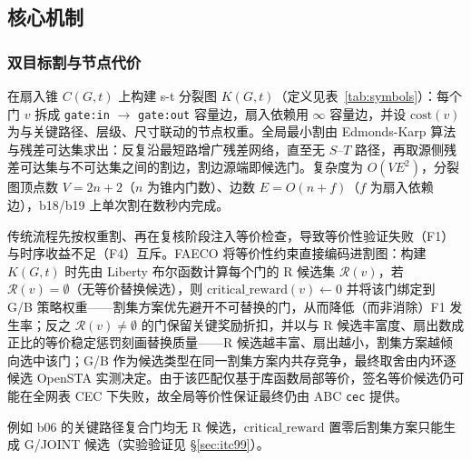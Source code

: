 \documentclass[journal]{IEEEtran}
\begin{document}
\subsection{核心机制}\label{sec:mechanism}

\subsubsection{双目标割与节点代价}
在扇入锥 $C(G, t)$ 上构建 s-t 分裂图 $K(G, t)$（定义见表~\ref{tab:symbols}）：每个门 $v$ 拆成 \texttt{gate:in} $\rightarrow$ \texttt{gate:out} 容量边，扇入依赖用 $\infty$ 容量边，并设 $\mathrm{cost}(v)$ 为与关键路径、层级、尺寸联动的节点权重。全局最小割由 Edmonds-Karp 算法与残差可达集求出：反复沿最短路增广残差网络，直至无 $S$--$T$ 路径，再取源侧残差可达集与不可达集之间的割边，割边源端即候选门。复杂度为 $O(VE^2)$，分裂图顶点数 $V=2n+2$（$n$ 为锥内门数）、边数 $E=O(n+f)$（$f$ 为扇入依赖边），b18/b19 上单次割在数秒内完成。

传统流程先按权重割、再在复核阶段注入等价检查，导致等价性验证失败（F1）与时序收益不足（F4）互斥。FAECO 将等价性约束直接编码进割图：构建 $K(G, t)$ 时先由 Liberty 布尔函数计算每个门的 R 候选集 $\mathcal{R}(v)$，若 $\mathcal{R}(v)=\emptyset$（无等价替换候选），则 $\mathrm{critical\_reward}(v) \leftarrow 0$ 并将该门绑定到 G/B 策略权重——割集方案优先避开不可替换的门，从而降低（而非消除）F1 发生率；反之 $\mathcal{R}(v)\neq\emptyset$ 的门保留关键奖励折扣，并以与 R 候选丰富度、扇出数成正比的等价稳定惩罚刻画替换质量——R 候选越丰富、扇出越小，割集方案越倾向选中该门；G/B 作为候选类型在同一割集方案内共存竞争，最终取舍由内环逐候选 OpenSTA 实测决定。由于该匹配仅基于库函数局部等价，签名等价候选仍可能在全网表 CEC 下失败，故全局等价性保证最终仍由 ABC \texttt{cec} 提供。

例如 b06 的关键路径复合门均无 R 候选，$\mathrm{critical\_reward}$ 置零后割集方案只能生成 G/JOINT 候选（实验验证见 \S\ref{sec:itc99}）。
\end{document}
